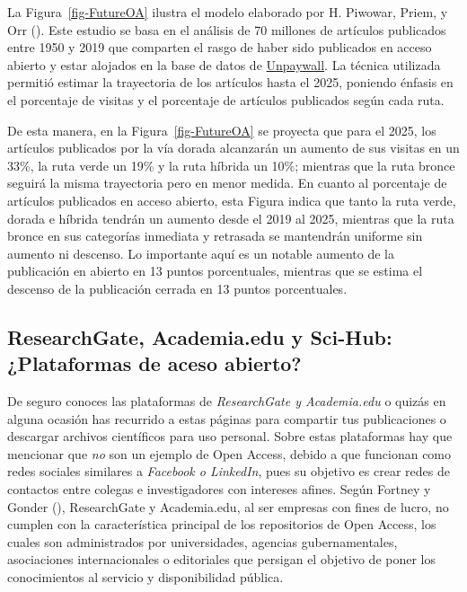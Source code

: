 \documentclass[
  spanish,
  a4paper,
  oneside]{scrbook}
\begin{document}
La Figura~\ref{fig-FutureOA} ilustra el modelo elaborado por H. Piwowar,
Priem, y Orr (). Este estudio se
basa en el análisis de 70 millones de artículos publicados entre 1950 y
2019 que comparten el rasgo de haber sido publicados en acceso abierto y
estar alojados en la base de datos de
\href{https://unpaywall.org/}{Unpaywall}. La técnica utilizada permitió
estimar la trayectoria de los artículos hasta el 2025, poniendo énfasis
en el porcentaje de visitas y el porcentaje de artículos publicados
según cada ruta.

De esta manera, en la Figura~\ref{fig-FutureOA} se proyecta que para el
2025, los artículos publicados por la vía dorada alcanzarán un aumento
de sus visitas en un 33\%, la ruta verde un 19\% y la ruta híbrida un
10\%; mientras que la ruta bronce seguirá la misma trayectoria pero en
menor medida. En cuanto al porcentaje de artículos publicados en acceso
abierto, esta Figura indica que tanto la ruta verde, dorada e híbrida
tendrán un aumento desde el 2019 al 2025, mientras que la ruta bronce en
sus categorías inmediata y retrasada se mantendrán uniforme sin aumento
ni descenso. Lo importante aquí es un notable aumento de la publicación
en abierto en 13 puntos porcentuales, mientras que se estima el descenso
de la publicación cerrada en 13 puntos porcentuales.

\subsection{ResearchGate, Academia.edu y Sci-Hub: ¿Plataformas de aceso
abierto?}\label{researchgate-academia.edu-y-sci-hub-plataformas-de-aceso-abierto}

De seguro conoces las plataformas de \emph{ResearchGate y Academia.edu}
o quizás en alguna ocasión has recurrido a estas páginas para compartir
tus publicaciones o descargar archivos científicos para uso personal.
Sobre estas plataformas hay que mencionar que \emph{no} son un ejemplo
de Open Access, debido a que funcionan como redes sociales similares a
\emph{Facebook o LinkedIn}, pues su objetivo es crear redes de contactos
entre colegas e investigadores con intereses afines. Según Fortney y
Gonder (), ResearchGate y
Academia.edu, al ser empresas con fines de lucro, no cumplen con la
característica principal de los repositorios de Open Access, los cuales
son administrados por universidades, agencias gubernamentales,
asociaciones internacionales o editoriales que persigan el objetivo de
poner los conocimientos al servicio y disponibilidad pública.
\end{document}
